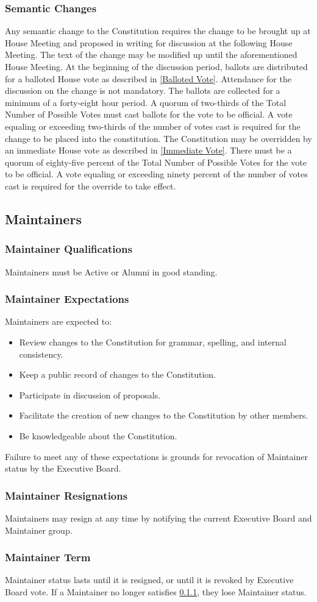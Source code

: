 \documentclass{article}
\newcommand{\asection}[1]{\subsection{#1} \label{#1}}
\newcommand{\asubsection}[1]{\subsubsection{#1} \label{#1}}
\begin{document}
\asubsection{Semantic Changes}
Any semantic change to the Constitution requires the change to be brought up at House Meeting and proposed in writing for discussion at the following House Meeting.
The text of the change may be modified up until the aforementioned House Meeting. 
At the beginning of the discussion period, ballots are distributed for a balloted House vote as described in \ref{Balloted Vote}.
Attendance for the discussion on the change is not mandatory.
The ballots are collected for a minimum of a forty-eight hour period.
A quorum of two-thirds of the Total Number of Possible Votes must cast ballots for the vote to be official.
A vote equaling or exceeding two-thirds of the number of votes cast is required for the change to be placed into the constitution.
The Constitution may be overridden by an immediate House vote as described in \ref{Immediate Vote}.
There must be a quorum of eighty-five percent of the Total Number of Possible Votes for the vote to be official.
A vote equaling or exceeding ninety percent of the number of votes cast is required for the override to take effect.

\asection{Maintainers}

\asubsection{Maintainer Qualifications}
Maintainers must be Active or Alumni in good standing.

\asubsection{Maintainer Expectations}
Maintainers are expected to:
\begin{itemize}
    \item Review changes to the Constitution for grammar, spelling, and internal consistency.
    \item Keep a public record of changes to the Constitution.
    \item Participate in discussion of proposals.
    \item Facilitate the creation of new changes to the Constitution by other members.
    \item Be knowledgeable about the Constitution.
\end{itemize}
Failure to meet any of these expectations is grounds for revocation of Maintainer status by the Executive Board.

\asubsection{Maintainer Resignations}
Maintainers may resign at any time by notifying the current Executive Board and Maintainer group.

\asubsection{Maintainer Term}
Maintainer status lasts until it is resigned, or until it is revoked by Executive Board vote.
If a Maintainer no longer satisfies \ref{Maintainer Qualifications}, they lose Maintainer status.
\end{document}
